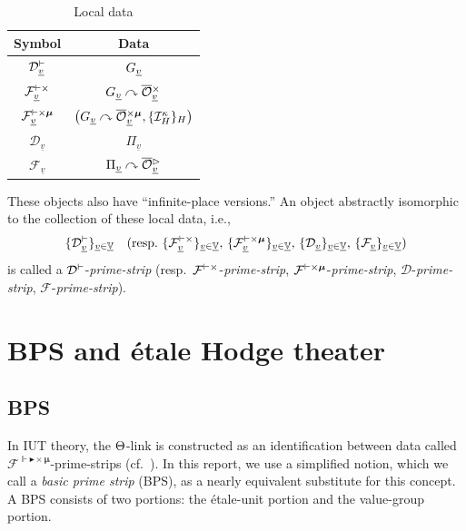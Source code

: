 \documentclass[12pt, reqno, a4paper]{amsart}
\def\udl#1{\underline{#1}} %
\def\acton{\curvearrowright} %
\def\bV{\mathbb{V}}
\def\cD{{\mathcal{D}}}
\def\cF{{\mathcal{F}}}
\def\cI{{\mathcal{I}}}
\def\uV{\udl{\bV}} %
\def\uv{\udl{v}} %
\begin{document}
\renewcommand{\arraystretch}{1.3}
\begin{table}[ht]
    \centering
    \begin{tabular}{|c|c|}
        \hline
         Symbol & Data \\ \hline\hline
        $\cDv_{\uv}$ & $\GG_{\uv}$\\ \hline
        $\cFvx_{\uv}$ &  $\GG_{\uv} \acton \oOOx_{\uv}$\\ \hline
        $\cFvxmu_{\uv}$ & $\bigl(\GG_{\uv} \acton \oOOxmu_{\uv},\{\cI^{\kappa}_H\}_H\bigr)$\\ \hline
        $\cD_{\uv}$ &  $\Pi_{\uv}$\\ \hline
        $\cF_{\uv}$ & $\Pi_{\uv} \acton \oOOt_{\uv}$\\ \hline
    \end{tabular}

    \bigskip
    \caption{Local data}\label{tab: Local data}
\end{table}

These objects also have ``infinite-place versions.''  An object abstractly isomorphic to the collection of these local data, i.e.,
$$
\{\cDv_{\uv}\}_{\uv \in \uV}\quad\text{(resp.\ $\{\cFvx_{\uv}\}_{\uv \in \uV}$, $\{\cFvxmu_{\uv}\}_{\uv \in \uV}$, $\{\cD_{\uv}\}_{\uv \in \uV}$, $\{\cF_{\uv}\}_{\uv \in \uV}$)}
$$
is called a $\cDv$-\emph{prime-strip} (resp.\ $\cFvx$-\emph{prime-strip}, $\cFvxmu$-\emph{prime-strip}, $\cD$-\emph{prime-strip}, $\cF$-\emph{prime-strip}).


\setcounter{equation}{0}
\section{BPS and \'etale Hodge theater}\label{sec:BPSandEtHT}

\subsection{BPS}\label{sub:BPS}

In IUT theory, the $\Th$-link is constructed as an identification between data called $\cF^{\Vdash\blacktriangleright\times\bm{\mu}}$-prime-strips (cf.\ \cite[Def.\ 4.9, (viii), p.\ 384]{MR4225474}). In this report, we use a simplified notion, which we call a \emph{basic prime strip} (BPS), as a nearly equivalent substitute for this concept. A BPS consists of two portions: the \'etale-unit portion and the value-group portion.
\end{document}
